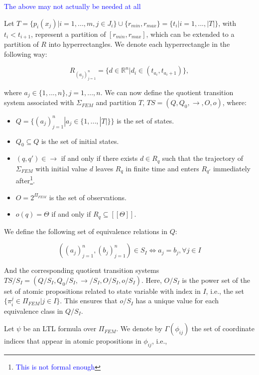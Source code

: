 \documentclass{article}
\newcommand*{\R}{\mathbb{R}}
\newcommand*{\fran}[1]{\textcolor{blue}{#1}}
\begin{document}
\fran{The above may not actually be needed at all}

Let $T = \{ p_i(x_j) | i = 1,...,m, j \in J_i \} \cup \{r_{min}, r_{max}\} =
\{t_i | i = 1,..., |T|\}$, with $t_i < t_{i+1}$, represent a partition of $[r_{min},
r_{max}]$, which can be extended to a partition of $R$ into hyperrectangles. We
denote each hyperrectangle in the following way:

\begin{equation}
    R_{(a_j)_{j=1}^n} = \{d \in \R^n | d_i \in (t_{a_i}, t_{a_i + 1})\},
\end{equation}

where $a_j \in \{1,...,n\}, j=1,...,n$. We can now define the quotient
transition system associated with $\Sigma_{FEM}$ and partition $T$,
$TS = (Q, Q_0, \rightarrow, O, o)$, where:

\begin{itemize}
    \item $Q = \{(a_j)_{j=1}^n | a_j \in \{1,...,|T|\}\}$ is the set of states.
    \item $Q_0 \subseteq Q$ is the set of initial states.
    \item $(q,q') \in \rightarrow$ if and only if there exists $d \in R_q$ such
        that the trajectory of $\Sigma_{FEM}$ with initial value $d$ leaves
        $R_q$ in finite time and enters $R_{q'}$ immediately
        after\footnote{\fran{This is not formal enough}}.
    \item $O = 2^{\Pi_{FEM}}$ is the set of observations.
    \item $o(q) = \Theta$ if and only if $R_q \subseteq [[\Theta]]$.
\end{itemize}

We define the following set of equivalence relations in $Q$:

\begin{equation}
    ((a_j)_{j=1}^n,(b_j)_{j=1}^n) \in S_I \iff a_j = b_j, \forall j \in I
\end{equation}

And the corresponding quotient transition systems $TS/S_I = (Q/S_I, Q_0/S_I,
\to/S_I, O/S_I, o/S_I)$. Here, $O/S_I$ is the power set of the set of atomic
propositions related to state variable with index in $I$, i.e., the set
$\{\pi_i^j \in \Pi_{FEM} | j \in I \}$. This ensures that $o/S_I$ has a unique
value for each equivalence class in $Q/S_I$.

Let $\psi$ be an LTL formula over $\Pi_{FEM}$. We
denote by $\Gamma(\phi_{ij})$ the set of coordinate indices that appear in
atomic propositions in $\phi_{ij}$, i.e.,
\end{document}

